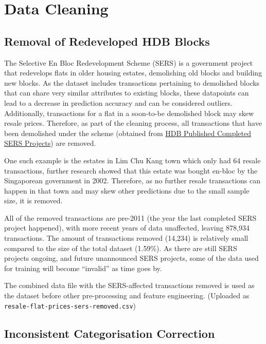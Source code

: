 \documentclass[[12pt,conference]{IEEEtran}
\begin{document}
\section{Data Cleaning}


\subsection{Removal of Redeveloped HDB Blocks}
The Selective En Bloc Redevelopment Scheme (SERS) is a government project that redevelops flats in older housing estates, demolishing old blocks and building new blocks. 
As the dataset includes transactions pertaining to demolished blocks that can share very similar attributes to existing blocks, these datapoints can lead to a decrease in prediction accuracy and can be considered outliers. 
Additionally, transactions for a flat in a soon-to-be demolished block may skew resale prices.
Therefore, as part of the cleaning process, all transactions that have been demolished under the scheme (obtained from \href{https://www.hdb.gov.sg/residential/living-in-an-hdb-flat/sers-and-upgrading-programmes/sers/sers-projects/completed-sers-projects}{HDB Published Completed SERS Projects}) are removed. 

One such example is the estates in Lim Chu Kang town which only had 64 resale transactions, further research showed that this estate was bought en-bloc by the Singaporean government in 2002. 
Therefore, as no further resale transactions can happen in that town and may skew other predictions due to the small sample size, it is removed.

All of the removed transactions are pre-2011 (the year the last completed SERS project happened), with more recent years of data unaffected, leaving 878,934 transactions. 
The amount of transactions removed (14,234) is relatively small compared to the size of the total dataset (1.59\%).
As there are still SERS projects ongoing, and future unannounced SERS projects, some of the data used for training will become ``invalid'' as time goes by. 

The combined data file with the SERS-affected transactions removed is used as the dataset before other pre-processing and feature engineering. (Uploaded as \texttt{resale-flat-prices-sers-removed.csv})

\subsection{Inconsistent Categorisation Correction}
\end{document}
